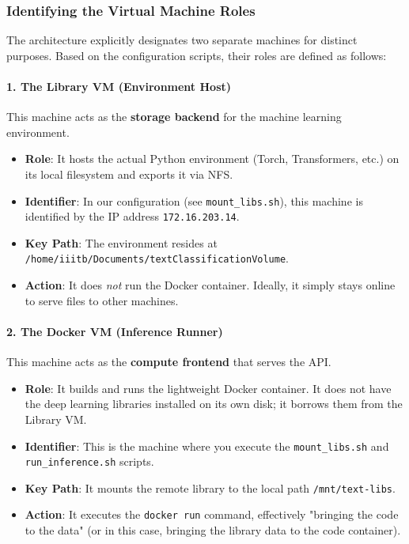 \documentclass[10pt,a4paper,twocolumn]{article}
\begin{document}
\subsubsection{Identifying the Virtual Machine Roles}

The architecture explicitly designates two separate machines for distinct purposes. Based on the configuration scripts, their roles are defined as follows:

\paragraph{1. The Library VM (Environment Host)}
This machine acts as the \textbf{storage backend} for the machine learning environment.
\begin{itemize}
    \item \textbf{Role}: It hosts the actual Python environment (Torch, Transformers, etc.) on its local filesystem and exports it via NFS.
    \item \textbf{Identifier}: In our configuration (see \texttt{mount\_libs.sh}), this machine is identified by the IP address \texttt{172.16.203.14}.
    \item \textbf{Key Path}: The environment resides at \texttt{/home/iiitb/Documents/textClassificationVolume}.
    \item \textbf{Action}: It does \textit{not} run the Docker container. Ideally, it simply stays online to serve files to other machines.
\end{itemize}

\paragraph{2. The Docker VM (Inference Runner)}
This machine acts as the \textbf{compute frontend} that serves the API.
\begin{itemize}
    \item \textbf{Role}: It builds and runs the lightweight Docker container. It does not have the deep learning libraries installed on its own disk; it borrows them from the Library VM.
    \item \textbf{Identifier}: This is the machine where you execute the \texttt{mount\_libs.sh} and \texttt{run\_inference.sh} scripts.
    \item \textbf{Key Path}: It mounts the remote library to the local path \texttt{/mnt/text-libs}.
    \item \textbf{Action}: It executes the \texttt{docker run} command, effectively "bringing the code to the data" (or in this case, bringing the library data to the code container).
\end{itemize}
\end{document}
